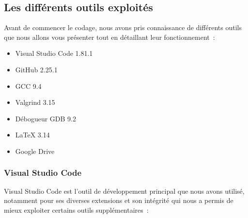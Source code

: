 \documentclass[12pt,a4paper]{article}
\begin{document}
        \subsection{Les différents outils exploités}
            \tabto{1cm} Avant de commencer le codage, nous avons pris connaissance de différents outils que nous allons vous présenter tout en détaillant leur fonctionnement~:\\
            
            \begin{itemize}
                \item Visual Studio Code 1.81.1
                \item GitHub 2.25.1
                \item GCC  9.4
                \item Valgrind 3.15
                \item Débogueur GDB 9.2
                \item LaTeX 3.14
                \item Google Drive
            \end{itemize}

             \subsubsection{Visual Studio Code}
                \tabto{1cm} Visual Studio Code est l’outil de développement principal que nous avons utilisé, notamment pour ses diverses extensions et son intégrité qui nous a permis de mieux exploiter certains outils supplémentaires~:\\

                \newpage
                
\end{document}
